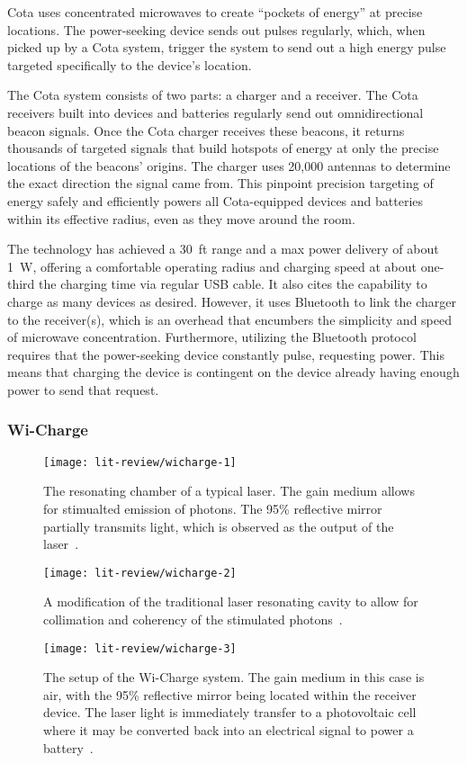 Cota uses concentrated microwaves to create ``pockets of energy'' at precise locations. The power-seeking device sends out pulses regularly, which, when picked up by a Cota system, trigger the system to send out a high energy pulse targeted specifically to the device's location.

The Cota system consists of two parts: a charger and a receiver. The Cota receivers built into devices and batteries regularly send out omnidirectional beacon signals. Once the Cota charger receives these beacons, it returns thousands of targeted signals that build hotspots of energy at only the precise locations of the beacons' origins. The charger uses 20,000 antennas to determine the exact direction the signal came from. This pinpoint precision targeting of energy safely and efficiently powers all Cota-equipped devices and batteries within its effective radius, even as they move around the room.

The technology has achieved a 30~ft range and a max power delivery of about 1~W, offering a comfortable operating radius and charging speed at about one-third the charging time via regular USB cable. It also cites the capability to charge as many devices as desired. However, it uses Bluetooth to link the charger to the receiver(s), which is an overhead that encumbers the simplicity and speed of microwave concentration. Furthermore, utilizing the Bluetooth protocol requires that the power-seeking device constantly pulse, requesting power. This means that charging the device is contingent on the device already having enough power to send that request.

\subsubsection{Wi-Charge}

\begin{figure}[h!]
\centering
\texttt{[image: lit-review/wicharge-1]}
    \caption{The resonating chamber of a typical laser. The gain medium allows for stimualted emission of photons. The 95\% reflective mirror partially transmits light, which is observed as the output of the laser~\cite{wicharge2016}.}
    \label{fig:lit-review-wicharge-1}
\end{figure}
\begin{figure}[h!]
\centering
\texttt{[image: lit-review/wicharge-2]}
    \caption{A modification of the traditional laser resonating cavity to allow for collimation and coherency of the stimulated photons~\cite{wicharge2016}.}
    \label{fig:lit-review-wicharge-2}
\end{figure}
\begin{figure}[h!]
\centering
\texttt{[image: lit-review/wicharge-3]}
    \caption{The setup of the Wi-Charge system. The gain medium in this case is air, with the 95\% reflective mirror being located within the receiver device. The laser light is immediately transfer to a photovoltaic cell where it may be converted back into an electrical signal to power a battery~\cite{wicharge2016}.}
    \label{fig:lit-review-wicharge-3}
\end{figure}

